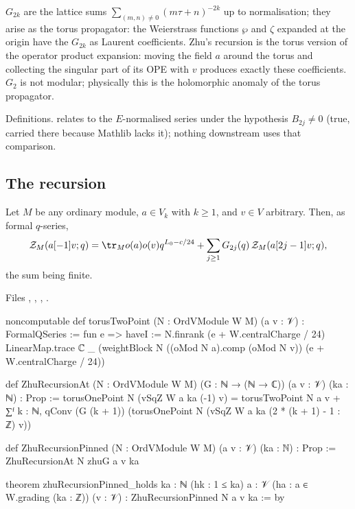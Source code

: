 \begin{physics}
$G_{2k}$ are the lattice sums $\sum_{(m,n)\neq0}(m\tau+n)^{-2k}$ up to normalisation; they arise as the torus propagator: the
Weierstrass functions $\wp$ and $\zeta$ expanded at the origin have the $G_{2k}$ as Laurent coefficients. Zhu's recursion
is the torus version of the operator product expansion: moving the field $a$ around the torus and collecting the
singular part of its OPE with $v$ produces exactly these coefficients. $G_2$ is not modular; physically this is the
holomorphic anomaly of the torus propagator.
\end{physics}

\begin{status}
Definitions. \allowbreak{} relates  to the $E$-normalised series under the hypothesis
$B_{2j}\neq0$ (true, carried there because Mathlib lacks it); nothing downstream uses that comparison.
\end{status}

\subsection{The recursion}

\begin{theorem}\label{l15:thm:recursion}
Let $M$ be any ordinary module, $a\in V_{k}$ with $k\ge1$, and $v\in V$ arbitrary. Then, as formal $q$-series,
\begin{equation*}
  \lfifteenZ_M(a[-1]v;q)=\tr_M o(a)o(v)q^{L_0-c/24}+\sum_{j\ge1}G_{2j}(q)\,\lfifteenZ_M(a[2j-1]v;q),
\end{equation*}
the sum being finite.
\end{theorem}
\noindent Files ,
, ,
.
\begin{leancode}
noncomputable def torusTwoPoint (N : OrdVModule W M) (a v : 𝒱) : FormalQSeries :=
  fun e =>
    haveI := N.finrank (e + W.centralCharge / 24)
    LinearMap.trace ℂ _
      (weightBlock N ((oMod N a).comp (oMod N v)) (e + W.centralCharge / 24))

def ZhuRecursionAt (N : OrdVModule W M) (G : ℕ → (ℕ → ℂ)) (a v : 𝒱) (ka : ℕ) : Prop :=
  torusOnePoint N (vSqZ W a ka (-1) v)
    = torusTwoPoint N a v
      + ∑ᶠ k : ℕ, qConv (G (k + 1))
          (torusOnePoint N (vSqZ W a ka (2 * (k + 1) - 1 : ℤ) v))

def ZhuRecursionPinned (N : OrdVModule W M) (a v : 𝒱) (ka : ℕ) : Prop :=
  ZhuRecursionAt N zhuG a v ka

theorem zhuRecursionPinned_holds {ka : ℕ} (hk : 1 ≤ ka) {a : 𝒱} (ha : a ∈ W.grading (ka : ℤ))
    (v : 𝒱) : ZhuRecursionPinned N a v ka := by
\end{leancode}

